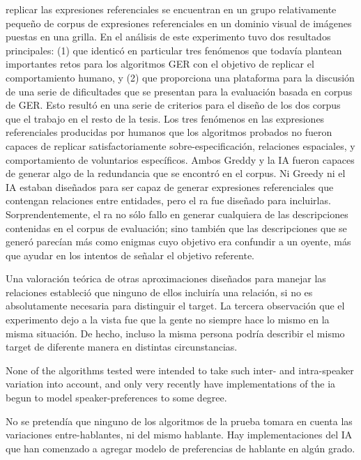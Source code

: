 replicar las expresiones referenciales se encuentran en un grupo relativamente peque\~no de corpus de expresiones referenciales
en un dominio visual de im\'agenes puestas en una grilla.
En el an\'alisis de este experimento tuvo dos resultados principales: (1) que identic\'o en particular tres 
fen\'omenos que todav\'ia plantean importantes retos para los algoritmos GER con el objetivo de replicar
el comportamiento humano, y (2) que proporciona una plataforma para la discusi\'on de una serie de
dificultades que se presentan para la evaluaci\'on basada en corpus de GER. Esto result\'o en una serie
de criterios para el dise\~no de los dos corpus que el trabajo en el resto de la tesis.
Los tres fen\'omenos en las expresiones referenciales producidas por humanos que los
algoritmos probados no fueron capaces de replicar satisfactoriamente sobre-especificaci\'on,
relaciones espaciales, y comportamiento de voluntarios espec\'ificos. Ambos
Greddy y la IA fueron capaces de generar algo de la redundancia que se encontr\'o en el corpus.
 Ni Greedy ni el IA estaban dise\~nados para ser capaz de generar expresiones referenciales que contengan relaciones entre entidades, pero el ra fue dise\~nado para incluirlas. Sorprendentemente, el
ra no s\'olo fallo en generar cualquiera de las descripciones contenidas en el corpus de evaluaci\'on; sino tambi\'en que las descripciones que se gener\'o parec\'ian m\'as como enigmas cuyo objetivo era confundir a un oyente, m\'as que ayudar en
los intentos de se\~nalar el objetivo referente. 

Una valoraci\'on te\'orica de otras aproximaciones dise\~nados para manejar las relaciones estableci\'o que ninguno de ellos incluir\'ia una relaci\'on, si no es absolutamente necesaria para distinguir el target.
La tercera observaci\'on que el experimento dejo a la vista fue que la gente no siempre hace lo mismo en la misma situaci\'on. De hecho, incluso la misma persona podr\'ia describir el mismo target de diferente manera en distintas
circunstancias. 

 None of the algorithms tested were intended to take such inter- and
intra-speaker variation into account, and only very recently have implementations
of the
ia
begun to model speaker-preferences to some degree.

No se pretend\'ia que ninguno de los algoritmos de la prueba tomara en cuenta las variaciones entre-hablantes, ni del mismo hablante. Hay implementaciones del IA que han comenzado a agregar modelo de preferencias de hablante en alg\'un grado.

